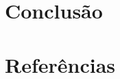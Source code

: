 \documentclass[a4paper, 12pt]{article}
\begin{document}
\begin{multicols}{2}
		\section{Conclusão}
		\label{sec:conclusao}
		
		\section{Referências}
		
	\end{multicols}
\end{document}
